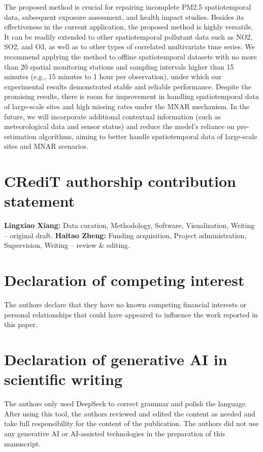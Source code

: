\documentclass[3p,11pt,authoryear]{elsarticle}
\begin{document}
The proposed method is crucial for repairing incomplete PM2.5 spatiotemporal data, subsequent exposure assessment, and health impact studies. 
Besides its effectiveness in the current application, the proposed method is highly versatile. It can be readily extended to other spatiotemporal pollutant data such as NO2, SO2, and O3, as well as to other types of correlated multivariate time series. We recommend applying the method to offline spatiotemporal datasets with no more than 20 spatial monitoring stations and sampling intervals higher than 15 minutes (e.g., 15 minutes to 1 hour per observation), under which our experimental results demonstrated stable and reliable performance. 
Despite the promising results, there is room for improvement in handling spatiotemporal data of large-scale sites and high missing rates under the MNAR mechanism. 
In the future, we will incorporate additional contextual information (such as meteorological data and sensor status) and reduce the model's reliance on pre-estimation algorithms, aiming to better handle spatiotemporal data of large-scale sites and MNAR scenarios.

\section*{CRediT authorship contribution statement}
\textbf{Lingxiao Xiang:} Data curation, Methodology, Software, Visualization, Writing – original draft. 
\textbf{Haitao Zheng:} Funding acquisition, Project administration, Supervision, Writing – review \& editing.

\section*{Declaration of competing interest}
The authors declare that they have no known competing financial interests or personal relationships that could have appeared to influence the work reported in this paper. 

\section*{Declaration of generative AI in scientific writing}
The authors only used DeepSeek to correct grammar and polish the language. After using this tool, the authors reviewed and edited the content as needed and take full responsibility for the content of the publication. The authors did not use any generative AI or AI-assisted technologies in the preparation of this manuscript. 
\end{document}
